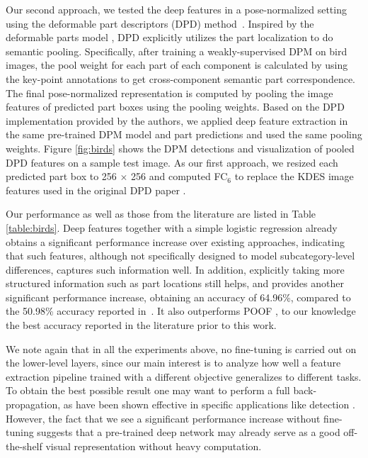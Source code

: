 Our second approach, we tested the deep features in a pose-normalized setting using the deformable part descriptors (DPD) method~\cite{dpd}. Inspired by the deformable parts model \cite{dpm}, DPD explicitly utilizes the part localization to do semantic pooling. Specifically, after training a weakly-supervised DPM on bird images, the pool weight for each part of each component is calculated by using the key-point annotations to get cross-component semantic part correspondence. The final pose-normalized representation is computed by pooling the image features of predicted part boxes using the pooling weights. Based on the DPD implementation provided by the authors, we applied deep feature extraction in the same pre-trained DPM model and part predictions and used the same pooling weights. Figure \ref{fig:birds} shows the DPM detections and visualization of pooled DPD features on a sample test image.  As our first approach, we resized each predicted part box to 256 $\times$ 256 and computed FC$_6$ to replace the KDES image features \cite{kdes} used in the original DPD paper \cite{dpd}.

Our performance as well as those from the literature are listed in Table \ref{table:birds}. Deep features together with a simple logistic regression already obtains a significant performance increase over existing approaches, indicating that such features, although not specifically designed to model subcategory-level differences, captures such information well. In addition, explicitly taking more structured information such as part locations still helps, and provides another significant performance increase, obtaining an accuracy of 64.96\%, compared to the 50.98\% accuracy reported in~\cite{dpd}. It also outperforms POOF \cite{poof}, to our knowledge the best accuracy reported in the literature prior to this work.

We note again that in all the experiments above, no fine-tuning is carried out on the lower-level layers, since our main interest is to analyze how well a feature extraction pipeline trained with a different objective generalizes to different tasks. To obtain the best possible result one may want to perform a full back-propagation, as have been shown effective in specific applications like detection \cite{girshick2013rich}. However, the fact
that we see a significant performance increase without fine-tuning suggests that
a pre-trained deep network may already serve as a good off-the-shelf visual representation without heavy computation.

